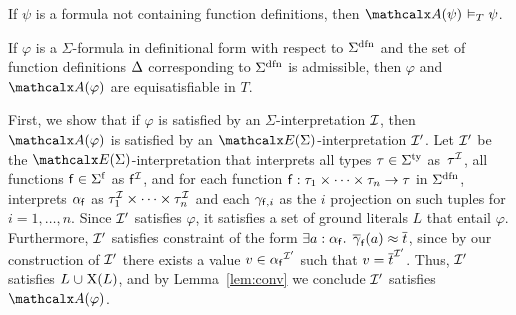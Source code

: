 \begin{lemma}\label{lem:conv}
If $\psi$ is a formula not containing function definitions, 
then $\conv( \psi ) \models_T\psi$.
\end{lemma}

\begin{theorem}\label{thm:equi}
If $\varphi$ is a\/ $\Sigma$-formula in definitional form with respect to\/
$\sfundefs{\Sigma}$
and the set of function definitions\/ $\DDD$ corresponding to\/
$\sfundefs{\Sigma}$ is admissible, then\/ $\varphi$ and\/ $\conv( \varphi )$ are
equisatisfiable in $T$.
\end{theorem}
\begin{proofsketch}
First, we show that if $\varphi$ is satisfied by an
$\Sigma$-interpretation $\mathcal{I}$, then $\conv( \varphi )$ is satisfied by an $\extendsig{\Sigma}$-interpretation ${\mathcal{I}'}$.
Let ${\mathcal{I}'}$ be the $\extendsig{\Sigma}$-interpretation that interprets all types $\tau \in \stypes{\Sigma}$ as~$\tau^{\mathcal{I}}$,
all functions $\con{f} \in \sfuns{\Sigma}$ as $\mathsf{f}^{\mathcal{I}}$,
and for each function $\mathsf{f} : \tau_1 \times \cdots \times \tau_n \rightarrow \tau$ in $\sfundefs{\Sigma}$,
interprets $\alpha_{\mathsf{f}}$ as $\tau_1^{\mathcal{I}} \times \cdots \times \tau_n^{\mathcal{I}}$
and each $\gamma_{\mathsf{f},i}$ as the $i$ projection on such tuples for $i = 1, \dotsc, n$.
Since ${\mathcal{I}'}$ satisfies $\varphi$, it satisfies a set of ground literals $L$ that entail $\varphi$.
Furthermore, ${\mathcal{I}'}$ satisfies  constraint of the form $\exists a : {\alpha_{\mathsf{f}}}.\;\, \overline{\gamma}_{\mathsf{f}}( a ) \approx \overline{t}$,
since by our construction of ${\mathcal{I}'}$ there exists a value $v \in {\alpha_{\mathsf{f}}}^{\mathcal{I}'}$ such that $v = \overline{t}^{\mathcal{I}'}$.
Thus, ${\mathcal{I}'}$ satisfies $L \cup \absconstraints( L )$, and by Lemma~\ref{lem:conv}
we conclude ${\mathcal{I}'}$ satisfies $\conv( \varphi )$.


\end{proofsketch}
